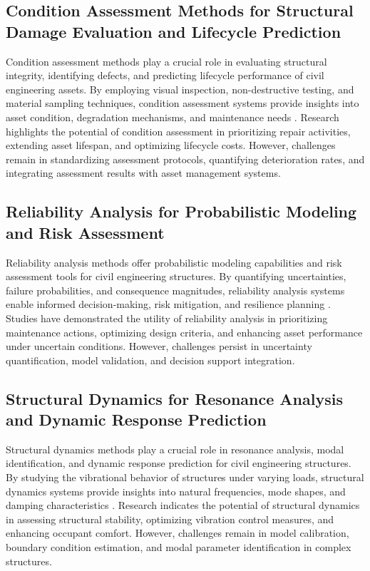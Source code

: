 \documentclass[journal, a4paper]{IEEEtran}
\begin{document}
\subsection{Condition Assessment Methods for Structural Damage Evaluation and Lifecycle Prediction}
Condition assessment methods play a crucial role in evaluating structural integrity, identifying defects,
and predicting lifecycle performance of civil engineering assets. By employing visual inspection, non-destructive testing,
and material sampling techniques, condition assessment systems provide insights into asset condition, degradation mechanisms,
and maintenance needs \cite{dong_ultrasonic_2022} \cite{li_physics-informed_2023} \cite{yifei_structure_2023}. Research highlights the potential of condition assessment in prioritizing repair
activities, extending asset lifespan, and optimizing lifecycle costs. However, challenges remain in standardizing assessment
protocols, quantifying deterioration rates, and integrating assessment results with asset management systems.

\subsection{Reliability Analysis for Probabilistic Modeling and Risk Assessment}
Reliability analysis methods offer probabilistic modeling capabilities and risk assessment tools for civil engineering structures.
By quantifying uncertainties, failure probabilities, and consequence magnitudes, reliability analysis
systems enable informed decision-making, risk mitigation, and resilience planning \cite{pachon_evaluation_2020} \cite{wu_internal_2024} \cite{zima_damage_2021}.
Studies have demonstrated the utility of reliability analysis in prioritizing maintenance actions,
optimizing design criteria, and enhancing asset performance under uncertain conditions.
However, challenges persist in uncertainty quantification, model validation, and decision support integration.

\subsection{Structural Dynamics for Resonance Analysis and Dynamic Response Prediction}
Structural dynamics methods play a crucial role in resonance analysis, modal identification, and dynamic
response prediction for civil engineering structures. By studying the vibrational behavior of structures under
varying loads, structural dynamics systems provide insights into natural frequencies, mode shapes, and damping
characteristics \cite{de_sa_rodrigues_probability_2023} \cite{zhang_defect_2020} \cite{wang_fatigue_2023}. Research indicates the potential of structural dynamics in assessing structural
stability, optimizing vibration control measures, and enhancing occupant comfort. However, challenges remain in model
calibration, boundary condition estimation, and modal parameter identification in complex structures.
\end{document}
